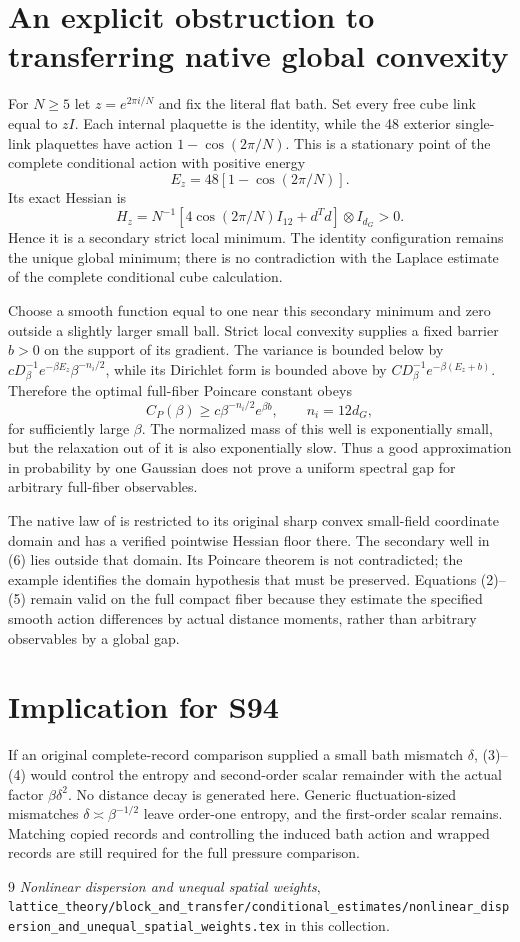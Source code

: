 \documentclass{article}
\begin{document}
\section{An explicit obstruction to transferring native global convexity}
For $N\geq5$ let $z=e^{2\pi i/N}$ and fix the literal flat bath. Set every free cube link equal to $zI$. Each internal plaquette is the identity, while the 48 exterior single-link plaquettes have action $1-\cos(2\pi/N)$. This is a stationary point of the complete conditional action with positive energy
\[
 E_z=48[1-\cos(2\pi/N)].
\]
Its exact Hessian is
\[
 H_z=N^{-1}[4\cos(2\pi/N)I_{12}+d^Td]\otimes I_{d_G}>0.
 \tag{6}
\]
Hence it is a secondary strict local minimum. The identity configuration remains the unique global minimum; there is no contradiction with the Laplace estimate of the complete conditional cube calculation.

Choose a smooth function equal to one near this secondary minimum and zero outside a slightly larger small ball. Strict local convexity supplies a fixed barrier $b>0$ on the support of its gradient. The variance is bounded below by $cD_\beta^{-1}e^{-\beta E_z}\beta^{-n_i/2}$, while its Dirichlet form is bounded above by $CD_\beta^{-1}e^{-\beta(E_z+b)}$. Therefore the optimal full-fiber Poincare constant obeys
\[
 C_P(\beta)\geq c\beta^{-n_i/2}e^{\beta b},\qquad n_i=12d_G,
 \tag{7}
\]
for sufficiently large $\beta$. The normalized mass of this well is exponentially small, but the relaxation out of it is also exponentially slow. Thus a good approximation in probability by one Gaussian does not prove a uniform spectral gap for arbitrary full-fiber observables.

The native law of \cite[Section 3]{ND} is restricted to its original sharp convex small-field coordinate domain and has a verified pointwise Hessian floor there. The secondary well in (6) lies outside that domain. Its Poincare theorem is not contradicted; the example identifies the domain hypothesis that must be preserved. Equations (2)--(5) remain valid on the full compact fiber because they estimate the specified smooth action differences by actual distance moments, rather than arbitrary observables by a global gap.

\section{Implication for S94}
If an original complete-record comparison supplied a small bath mismatch $\delta$, (3)--(4) would control the entropy and second-order scalar remainder with the actual factor $\beta\delta^2$. No distance decay is generated here. Generic fluctuation-sized mismatches $\delta\asymp\beta^{-1/2}$ leave order-one entropy, and the first-order scalar remains. Matching copied records and controlling the induced bath action and wrapped records are still required for the full pressure comparison.
\begin{thebibliography}{9}
 \emph{Nonlinear dispersion and unequal spatial weights}, \texttt{lattice\_theory/block\_and\_transfer/conditional\_estimates/nonlinear\_dispersion\_and\_unequal\_spatial\_weights.tex} in this collection.
\end{thebibliography}
\end{document}
